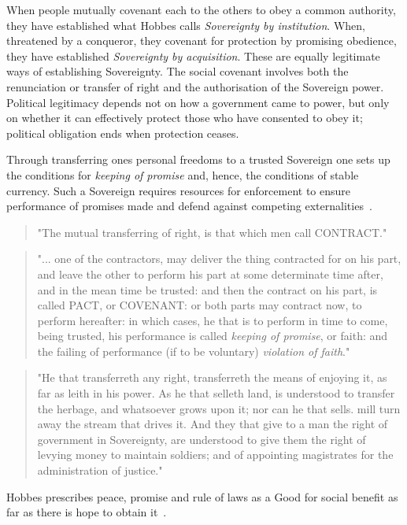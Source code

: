 \documentclass[11pt, oneside]{article}   	%
\begin{document}
When people mutually covenant each to the others to obey a common authority, they have established what Hobbes calls \emph{Sovereignty by institution}. When, threatened by a conqueror, they covenant for protection by promising obedience, they have established \emph{Sovereignty by acquisition}. These are equally legitimate ways of establishing Sovereignty. The social covenant involves both the renunciation or transfer of right and the authorisation of the Sovereign power. Political legitimacy depends not on how a government came to power, but only on whether it can effectively protect those who have consented to obey it; political obligation ends when protection ceases.\par

Through transferring ones personal freedoms to a trusted Sovereign one sets up the conditions for \emph{keeping of promise} and, hence, the conditions of stable currency. Such a Sovereign requires resources for enforcement to ensure performance of promises made and defend against competing externalities~\cite{th1}.

\begin{quote}
"The mutual transferring of right, is that which men call CONTRACT."
\end{quote}
\begin{quote}
"... one of the contractors, may deliver the thing contracted for on his part, and leave the other to perform his part at some determinate time after, and in the mean time be trusted: and then the contract on his part, is called PACT, or COVENANT: or both parts may contract now, to perform hereafter: in which cases, he that is to perform in time to come, being trusted, his performance is called \emph{keeping of promise}, or faith: and the failing of performance (if to be voluntary) \emph{violation of faith}."
\end{quote}
\begin{quote}
"He that transferreth any right, transferreth the means of enjoying it, as far as leith in his power. As he that selleth land, is understood to transfer the herbage, and whatsoever grows upon it; nor can he that sells. mill turn away the stream that drives it. And they that give to a man the right of government in Sovereignty, are understood to give them the right of levying money to maintain soldiers; and of appointing magistrates for the administration of justice."
\end{quote}

Hobbes prescribes peace, promise and rule of laws as a Good for social benefit as far as there is hope to obtain it~\cite{th1}.
\end{document}
